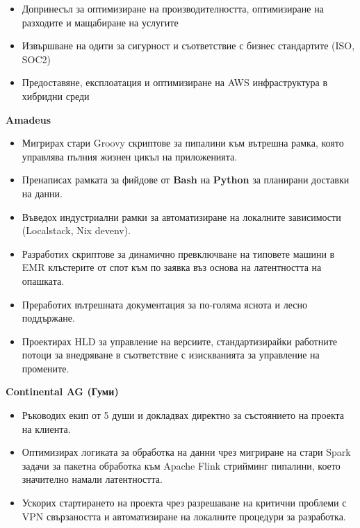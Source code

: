 
\small
\begin{itemize}[label=\tiny$\bullet$, leftmargin=1em]
	\item Допринесъл за оптимизиране на производителността, оптимизиране на разходите и мащабиране на услугите
	\item Извършване на одити за сигурност и съответствие с бизнес стандартите (ISO, SOC2)
	\item Предоставяне, експлоатация и оптимизиране на AWS инфраструктура в хибридни среди
\end{itemize}


\small

\noindent \textbf{Amadeus}

\begin{itemize}[label=\tiny$\bullet$, leftmargin=1em]
	\item Мигрирах стари Groovy скриптове за пипалини към вътрешна рамка, която управлява пълния жизнен цикъл на приложенията.
	\item Пренаписах рамката за фийдове от \textbf{Bash} на \textbf{Python} за планирани доставки на данни.
	\item Въведох индустриални рамки за автоматизиране на локалните зависимости (Localstack, Nix devenv).
	\item Разработих скриптове за динамично превключване на типовете машини в EMR клъстерите от спот към по заявка въз основа на латентността на опашката.
	\item Преработих вътрешната документация за по-голяма яснота и лесно поддържане.
	\item Проектирах HLD за управление на версиите, стандартизирайки работните потоци за внедряване в съответствие с изискванията за управление на промените.
\end{itemize}

\vspace{3.0ex}
 {}
\small

\noindent \textbf{Continental AG (Гуми)}
\begin{itemize}[label=\tiny$\bullet$, leftmargin=1em, nosep]
	\item Ръководих екип от 5 души и докладвах директно за състоянието на проекта на клиента.
	\item Оптимизирах логиката за обработка на данни чрез мигриране на стари Spark задачи за пакетна обработка към Apache Flink стрийминг пипалини, което значително намали латентността.
	\item Ускорих стартирането на проекта чрез разрешаване на критични проблеми с VPN свързаността и автоматизиране на локалните процедури за разработка.
\end{itemize}

